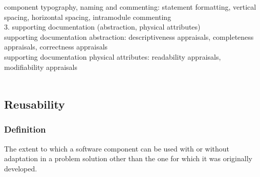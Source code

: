 \documentclass{article}
\begin{document}
component typography, naming and commenting: statement formatting, vertical spacing, horizontal spacing, intramodule commenting\\

3. supporting documentation (abstraction, physical attributes)\\
 
supporting documentation abstraction: descriptiveness appraisals, completeness appraisals, correctness appraisals\\

supporting documentation physical attributes: readability appraisals, modifiability appraisals\\

  
~\newpage

\subsection{Reusability}
\subsubsection{Definition}
The extent to which a software component can be used with or without adaptation in a problem solution other than the one for which it was originally developed.
\end{document}
